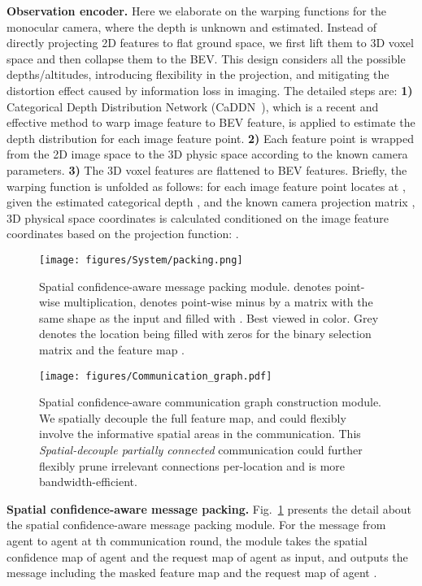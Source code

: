 \documentclass{article}
\begin{document}
\textbf{Observation encoder.} Here we elaborate on the warping functions for the monocular camera, where the depth is unknown and estimated. Instead of directly projecting 2D features to flat ground space, we first lift them to 3D voxel space and then collapse them to the BEV. This design considers all the possible depths/altitudes, introducing flexibility in the projection, and mitigating the distortion effect caused by information loss in imaging. The detailed steps are: {\bf 1)} Categorical Depth Distribution Network (CaDDN~\cite{CaDDN}), which is a recent and effective method to warp image feature to BEV feature, is applied to estimate the depth distribution for each image feature point. {\bf 2)} Each feature point is wrapped from the 2D image space to the 3D physic space according to the known camera parameters. {\bf 3)} The 3D voxel features are flattened to BEV features. Briefly, the warping function is unfolded as follows: for each image feature point locates at , given the estimated categorical depth , and the known camera projection matrix , 3D physical space coordinates  is calculated conditioned on the image feature coordinates  based on the projection function:  .


\begin{figure}
    \centering
\texttt{[image: figures/System/packing.png]}
    \caption{Spatial confidence-aware message packing module.  denotes point-wise multiplication,  denotes point-wise minus by a matrix with the same shape as the input and filled with . Best viewed in color. Grey denotes the location being filled with zeros for the binary selection matrix  and the feature map .}
    \label{fig:packing}
\end{figure}


\begin{figure}
    \centering
\texttt{[image: figures/Communication\_graph.pdf]}
    \caption{Spatial confidence-aware communication graph construction module. We spatially decouple the full feature map, and could flexibly involve the informative spatial areas in the communication. This \textit{Spatial-decouple partially connected} communication could further flexibly prune irrelevant connections per-location and is more bandwidth-efficient.}
    \label{fig:communication_graph}
\end{figure}


\textbf{Spatial confidence-aware message packing.} Fig.~\ref{fig:packing} presents the detail about the spatial confidence-aware message packing module. For the message from agent  to agent  at th communication round, the module takes the spatial confidence map  of agent  and the request map  of agent  as input, and outputs the message  including the masked feature map  and the request map of agent .
\end{document}

